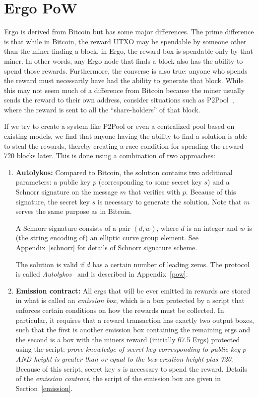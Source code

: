 \documentclass[11pt]{article}
\newcommand{\powname}{Autolykos\xspace}
\begin{document}
\section{Ergo PoW}

Ergo is derived from Bitcoin but has some major differences. The prime difference is that while in Bitcoin, the reward UTXO may be spendable by someone other than the miner finding a block, in Ergo, the reward box is spendable only by that miner. In other words, any Ergo node that finds a block also has the ability to spend those rewards. Furthermore, the converse is also true: anyone who spends the reward must necessarily have had the ability to generate that block. While this may not seem much of a difference from Bitcoin because the miner usually sends the reward to their own address, consider situations such as P2Pool~\cite{p2pool}, where the reward is sent to all the ``share-holders'' of that block. 

If we try to create a system like P2Pool or even a centralized pool based on existing models, we find that anyone having the ability to find a solution is able to steal the rewards, thereby creating a race condition for spending the reward 720 blocks later. This is done using a combination of two approaches:
\begin{enumerate}
	\item \textbf{\powname:} Compared to Bitcoin, the solution contains two additional parameters: a public key $p$ (corresponding to some secret key $s$) and a Schnorr signature on the message $m$ that verifies with $p$. Because of this signature, the secret key $s$ is necessary to generate the solution. Note that $m$ serves the same purpose as in Bitcoin.

	A Schnorr signature consists of a pair $(d, w)$, where $d$ is an integer and $w$ is (the string encoding of) an elliptic curve group element. See Appendix~\ref{schnorr} for details of Schnorr signature scheme. 

	The solution is valid if $d$ has a certain number of leading zeros. 
	The protocol is called {\em \powname}~\cite{autolykos} and is described in Appendix~\ref{pow}.
	\item \textbf{Emission contract:} All ergs that will be ever emitted in rewards are stored in what is called an {\em emission box}, which is a box protected by a script that enforces certain conditions on how the rewards must be collected. In particular, it requires that a reward transaction has exactly two output boxes, such that the first is another emission box containing the remaining ergs and the second is a box with the miners reward (initially 67.5 Ergs) protected using the script: {\em prove knowledge of secret key corresponding to public key $p$ AND height is greater than or equal to the box-creation height plus 720}. 
	Because of this script, secret key $s$ is necessary to spend the reward. 
	Details of the {\em emission contract}, the script of the emission box are given in Section~\ref{emission}.
\end{enumerate} 
\end{document}
